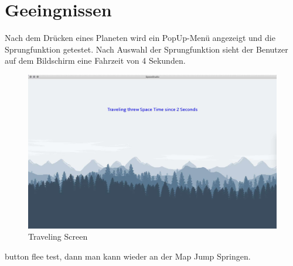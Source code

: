 \documentclass[12pt]{article}
\begin{document}
\section{Geeingnissen}
Nach dem Drücken eines Planeten wird ein PopUp-Menü angezeigt und die Sprungfunktion getestet.
Nach Auswahl der Sprungfunktion sieht der Benutzer auf dem Bildschirm eine Fahrzeit von 4 Sekunden.
\begin{figure}[htp]
\centering
\includegraphics[scale=0.4]{TestProtocolBilder/traveling.jpg}
\caption{Traveling Screen}
\end{figure}
button flee test, dann man kann wieder an der Map Jump Springen.
\newpage
\end{document}
